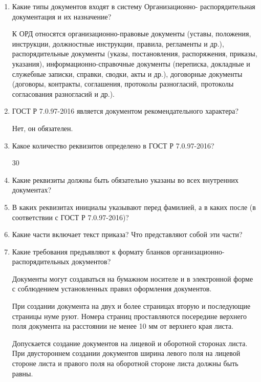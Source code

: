\begin{enumerate}
	\item Какие типы документов входят в систему Организационно- распорядительная документация и их назначение?
	
	К ОРД относятся организационно-правовые документы (уставы, положения, инструкции, должностные инструкции, правила, регламенты и др.), распорядительные документы (указы, постановления, распоряжения, приказы, указания), информационно-справочные документы (переписка, докладные и служебные записки, справки, сводки, акты и др.), договорные документы (договоры, контракты, соглашения, протоколы разногласий, протоколы согласования разногласий и др.).

\item ГОСТ Р 7.0.97-2016 является документом рекомендательного характера?

Нет, он обязателен.

\item Какое количество реквизитов определено в ГОСТ Р 7.0.97-2016?

30

\item Какие реквизиты должны быть обязательно указаны во всех внутренних документах?

\item В каких реквизитах инициалы указывают перед фамилией, а в каких после (в
соответствии с ГОСТ Р 7.0.97-2016)?

\item Какие части включает текст приказа? Что представляют собой эти части?

\item Какие требования предъявляют к формату бланков организационно-
распорядительных документов?

 Документы могут создаваться на бумажном носителе и в электронной форме с соблюдением установленных правил оформления документов.
 
 При создании документа на двух и более страницах вторую и последующие страницы нуме­ руют.
 Номера страниц проставляются посередине верхнего поля документа на расстоянии не менее 10 мм от верхнего края листа.
 
 Допускается создание документов на лицевой и оборотной сторонах листа. При двустороннем создании документов ширина левого поля на лицевой стороне листа и правого поля на оборотной сто­роне листа должны быть равны.

\end{enumerate}